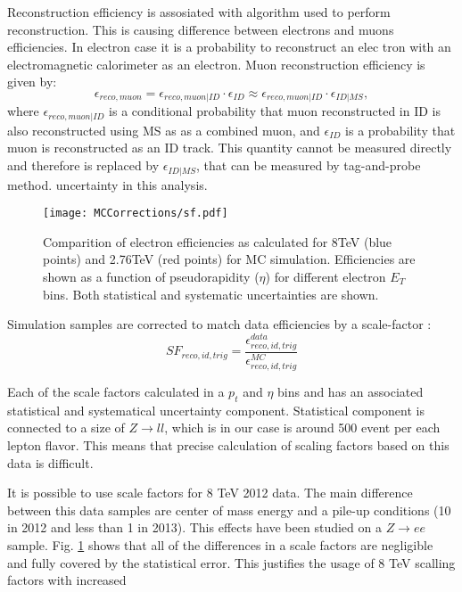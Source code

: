 Reconstruction efficiency is assosiated with algorithm used to perform reconstruction. This is causing difference between electrons and muons efficiencies. In electron case it is a probability to reconstruct an elec tron with an electromagnetic calorimeter as an electron.  Muon reconstruction efficiency is given by:
\begin{equation}
\epsilon_{reco,muon} = \epsilon_{reco,muon|ID} \cdot \epsilon_{ID} \approx \epsilon_{reco,muon|ID} \cdot \epsilon_{ID|MS},
\end{equation}
where $\epsilon_{reco,muon|ID}$ is a conditional probability that muon reconstructed in ID is also reconstructed using MS as as a combined muon, and  $\epsilon_{ID}$ is a probability that muon is reconstructed as an ID track. This quantity cannot be measured directly and therefore is replaced by $\epsilon_{ID|MS}$, that can be measured by tag-and-probe method. 
uncertainty in this analysis. 

\begin{figure}[t]
\centering
\texttt{[image: MCCorrections/sf.pdf]}
\caption{Comparition of electron efficiencies as calculated for 8TeV (blue points) and 2.76TeV (red points) for MC simulation. Efficiencies are shown as a function of pseudorapidity ($\eta$) for different electron $E_T$ bins. Both statistical and systematic uncertainties are shown. }
\label{eff_comp}
\end{figure}
Simulation samples are corrected to match data efficiencies by a scale-factor :
\begin{equation}
SF_{reco,id,trig}=\frac{\epsilon^{data}_{reco,id,trig}}{\epsilon^{MC}_{reco,id,trig}}
\end{equation}

Each of the scale factors calculated in a $p_{t}$ and $\eta$ bins and has an associated statistical and systematical uncertainty component. Statistical component is connected to a size of $Z\to ll$, which is in our case is around 500 event per each lepton flavor. This means that precise calculation of scaling factors based on this data is difficult.

It is possible to use scale factors for 8 TeV 2012 data. The main difference between this data samples are center of mass energy and a pile-up conditions (10 in 2012 and less than 1 in 2013). This effects have been studied on a $Z\to ee$ sample. Fig. \ref{eff_comp} shows that all of the differences in a scale factors are negligible and fully covered by the statistical error. This justifies the usage of 8 TeV scalling factors with increased 

